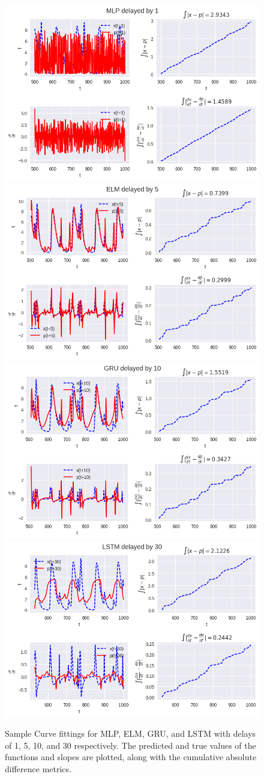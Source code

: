 \documentclass[11pt]{article}
\begin{document}
 \begin{figure}
   \begin{center}
   \includegraphics[width=.48\textwidth]{figures/MLP_1_mg2.png}
   \includegraphics[width=.48\textwidth]{figures/ELM_5_mg2.png}
   \includegraphics[width=.48\textwidth]{figures/GRU_10_mg2.png}
   \includegraphics[width=.48\textwidth]{figures/LSTM_30_mg2.png}
 \end{center}
 \caption{Sample Curve fittings for MLP, ELM, GRU, and LSTM with
   delays of 1, 5, 10, and 30 respectively. The predicted and true
   values of the functions and slopes are plotted, along with the
   cumulative absolute difference metrics.}
 \label{fig:mg2_func}
   \end{figure}
\end{document}
